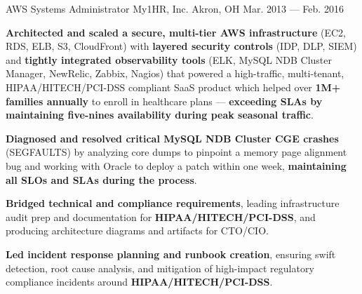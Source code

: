 \begin{cventries}
    \cventry
        { AWS Systems Administrator }
        { My1HR, Inc. }
        { Akron, OH }
        { Mar. 2013 --- Feb. 2016 }
        {
            \begin{cvitems}
                \item{\textbf{Architected and scaled a secure, multi-tier AWS infrastructure} (EC2, RDS, ELB, S3, CloudFront) with \textbf{layered security controls} (IDP, DLP, SIEM) and \textbf{tightly integrated observability tools} (ELK, MySQL NDB Cluster Manager, NewRelic, Zabbix, Nagios) that powered a high-traffic, multi-tenant, HIPAA/HITECH/PCI-DSS compliant SaaS product which helped over \textbf{1M+ families annually} to enroll in healthcare plans --- \textbf{exceeding SLAs by maintaining five-nines availability during peak seasonal traffic}.}
                \item{\textbf{Diagnosed and resolved critical MySQL NDB Cluster CGE crashes} (SEGFAULTS) by analyzing core dumps to pinpoint a memory page alignment bug and working with Oracle to deploy a patch within one week, \textbf{maintaining all SLOs and SLAs during the process}.}
                \item{\textbf{Bridged technical and compliance requirements}, leading infrastructure audit prep and documentation for \textbf{HIPAA/HITECH/PCI-DSS}, and producing architecture diagrams and artifacts for CTO/CIO.}
                \item{\textbf{Led incident response planning and runbook creation}, ensuring swift detection, root cause analysis, and mitigation of high-impact regulatory compliance incidents around \textbf{HIPAA/HITECH/PCI-DSS}.}
            \end{cvitems}
        }
\end{cventries}

